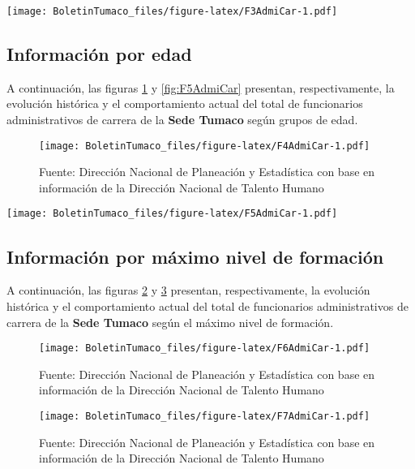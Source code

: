 \documentclass[
]{book}
\begin{document}
\texttt{[image: BoletinTumaco\_files/figure-latex/F3AdmiCar-1.pdf]}

\hypertarget{informaciuxf3n-por-edad-5}{%
\subsection{Información por edad}\label{informaciuxf3n-por-edad-5}}

A continuación, las figuras \ref{fig:F4AdmiCar} y \ref{fig:F5AdmiCar} presentan, respectivamente, la evolución histórica y el comportamiento actual del total de funcionarios administrativos de carrera de la \textbf{Sede Tumaco} según grupos de edad.

\begin{figure}
\centering
\texttt{[image: BoletinTumaco\_files/figure-latex/F4AdmiCar-1.pdf]}
\caption{\label{fig:F4AdmiCar}Fuente: Dirección Nacional de Planeación y Estadística con base en información de la Dirección Nacional de Talento Humano}
\end{figure}

\texttt{[image: BoletinTumaco\_files/figure-latex/F5AdmiCar-1.pdf]}

\hypertarget{informaciuxf3n-por-muxe1ximo-nivel-de-formaciuxf3n}{%
\subsection{Información por máximo nivel de formación}\label{informaciuxf3n-por-muxe1ximo-nivel-de-formaciuxf3n}}

A continuación, las figuras \ref{fig:F6AdmiCar} y \ref{fig:F7AdmiCar} presentan, respectivamente, la evolución histórica y el comportamiento actual del total de funcionarios administrativos de carrera de la \textbf{Sede Tumaco} según el máximo nivel de formación.

\begin{figure}
\centering
\texttt{[image: BoletinTumaco\_files/figure-latex/F6AdmiCar-1.pdf]}
\caption{\label{fig:F6AdmiCar}Fuente: Dirección Nacional de Planeación y Estadística con base en información de la Dirección Nacional de Talento Humano}
\end{figure}

\begin{figure}
\centering
\texttt{[image: BoletinTumaco\_files/figure-latex/F7AdmiCar-1.pdf]}
\caption{\label{fig:F7AdmiCar}Fuente: Dirección Nacional de Planeación y Estadística con base en información de la Dirección Nacional de Talento Humano}
\end{figure}
\end{document}
